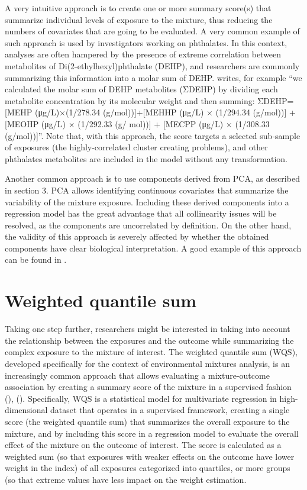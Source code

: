 \documentclass[
]{book}
\begin{document}
A very intuitive approach is to create one or more summary score(s) that summarize individual levels of exposure to the mixture, thus reducing the numbers of covariates that are going to be evaluated. A very common example of such approach is used by investigators working on phthalates. In this context, analyses are often hampered by the presence of extreme correlation between metabolites of Di(2-ethylhexyl)phthalate (DEHP), and researchers are commonly summarizing this information into a molar sum of DEHP. \citet{li2019serum} writes, for example ``we calculated the molar sum of DEHP metabolites (ΣDEHP) by dividing
each metabolite concentration by its molecular weight and then
summing: ΣDEHP={[}MEHP (μg/L)×(1/278.34 (g/mol)){]}+{[}MEHHP
(μg/L) × (1/294.34 (g/mol)){]} + {[}MEOHP (μg/L) × (1/292.33 (g/
mol)){]} + {[}MECPP (μg/L) × (1/308.33 (g/mol)){]}''. Note that, with this approach, the score targets a selected sub-sample of exposures (the highly-correlated cluster creating problems), and other phthalates metabolites are included in the model without any transformation.

Another common approach is to use components derived from PCA, as described in section 3. PCA allows identifying continuous covariates that summarize the variability of the mixture exposure. Including these derived components into a regression model has the great advantage that all collinearity issues will be resolved, as the components are uncorrelated by definition. On the other hand, the validity of this approach is severely affected by whether the obtained components have clear biological interpretation. A good example of this approach can be found in \citet{souter2020urinary}.

\hypertarget{weighted-quantile-sum}{%
\section{Weighted quantile sum}\label{weighted-quantile-sum}}

Taking one step further, researchers might be interested in taking into account the relationship between the exposures and the outcome while summarizing the complex exposure to the mixture of interest. The weighted quantile sum (WQS), developed specifically for the context of environmental mixtures analysis, is an increasingly common approach that allows evaluating a mixture-outcome association by creating a summary score of the mixture in a supervised fashion (\citet{czarnota2015assessment}), (\citet{carrico2015characterization}). Specifically, WQS is a statistical model for multivariate regression in high-dimensional dataset that operates in a supervised framework, creating a single score (the weighted quantile sum) that summarizes the overall exposure to the mixture, and by including this score in a regression model to evaluate the overall effect of the mixture on the outcome of interest. The score is calculated as a weighted sum (so that exposures with weaker effects on the outcome have lower weight in the index) of all exposures categorized into quartiles, or more groups (so that extreme values have less impact on the weight estimation.
\end{document}
